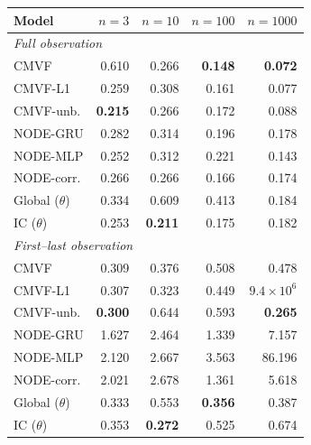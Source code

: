 \begin{tabular}{lrrrr}
\toprule
Model & $n{=}3$ & $n{=}10$ & $n{=}100$ & $n{=}1000$ \\
\midrule
\multicolumn{5}{l}{\emph{Full observation}} \\
CMVF & 0.610 & 0.266 & \textbf{0.148} & \textbf{0.072} \\
CMVF-L1 & 0.259 & 0.308 & 0.161 & 0.077 \\
CMVF-unb. & \textbf{0.215} & 0.266 & 0.172 & 0.088 \\
NODE-GRU & 0.282 & 0.314 & 0.196 & 0.178 \\
NODE-MLP & 0.252 & 0.312 & 0.221 & 0.143 \\
NODE-corr. & 0.266 & 0.266 & 0.166 & 0.174 \\
Global ($\theta$) & 0.334 & 0.609 & 0.413 & 0.184 \\
IC ($\theta$) & 0.253 & \textbf{0.211} & 0.175 & 0.182 \\
\midrule
\multicolumn{5}{l}{\emph{First--last observation}} \\
CMVF & 0.309 & 0.376 & 0.508 & 0.478 \\
CMVF-L1 & 0.307 & 0.323 & 0.449 & $9.4\!\times\!10^{6}$ \\
CMVF-unb. & \textbf{0.300} & 0.644 & 0.593 & \textbf{0.265} \\
NODE-GRU & 1.627 & 2.464 & 1.339 & 7.157 \\
NODE-MLP & 2.120 & 2.667 & 3.563 & 86.196 \\
NODE-corr. & 2.021 & 2.678 & 1.361 & 5.618 \\
Global ($\theta$) & 0.333 & 0.553 & \textbf{0.356} & 0.387 \\
IC ($\theta$) & 0.353 & \textbf{0.272} & 0.525 & 0.674 \\
\bottomrule
\end{tabular}
